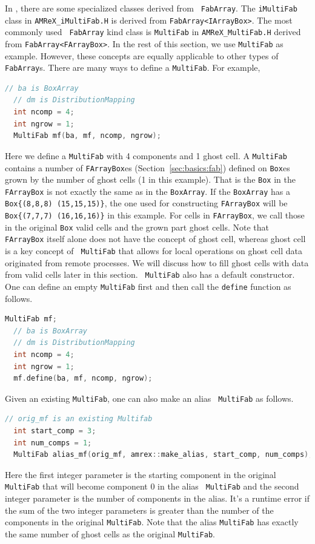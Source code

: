 {{In \amrex, there are some specialized classes derived from {\tt
  FabArray}.  The {\tt iMultiFab} class in {\tt AMReX\_iMultiFab.H} is
derived from {\tt FabArray<IArrayBox>}.  The most commonly used {\tt
  FabArray} kind class is {\tt MultiFab} in {\tt AMReX\_MultiFab.H}
derived from {\tt FabArray<FArrayBox>}.  In the rest of this section,
we use {\tt MultiFab} as example.  However, these concepts are equally
applicable to other types of {\tt FabArray}s.  There are many ways to
define a {\tt MultiFab}.  For example,
\begin{lstlisting}[language=cpp]
  // ba is BoxArray
  // dm is DistributionMapping
  int ncomp = 4;
  int ngrow = 1;
  MultiFab mf(ba, mf, ncomp, ngrow);
\end{lstlisting}
Here we define a {\tt MultiFab} with 4 components and 1 ghost cell.  A
{\tt MultiFab} contains a number of {\tt FArrayBox}es
(Section~\ref{sec:basics:fab}) defined on {\tt Box}es grown by the
number of ghost cells (1 in this example).  That is the {\tt Box} in
the {\tt FArrayBox} is not exactly the same as in the {\tt BoxArray}.
If the {\tt BoxArray} has a {\tt Box\{(8,8,8) (15,15,15)\}}, the one
used for constructing {\tt FArrayBox} will be {\tt Box\{(7,7,7)
  (16,16,16)\}} in this example.  For cells in {\tt FArrayBox}, we
call those in the original {\tt Box} valid cells and the grown part
ghost cells.  Note that {\tt FArrayBox} itself alone does not have the
concept of ghost cell, whereas ghost cell is a key concept of {\tt
  MultiFab} that allows for local operations on ghost cell data
originated from remote processes.  We will discuss how to fill ghost
cells with data from valid cells later in this section.  {\tt
  MultiFab} also has a default constructor.  One can define an empty
{\tt MultiFab} first and then call the {\tt define} function as
follows.
\begin{lstlisting}[language=cpp]
  MultiFab mf;
  // ba is BoxArray
  // dm is DistributionMapping
  int ncomp = 4;
  int ngrow = 1;
  mf.define(ba, mf, ncomp, ngrow);
\end{lstlisting}
Given an existing {\tt MultiFab}, one can also make an alias {\tt
  MultiFab} as follows.
\begin{lstlisting}[language=cpp]
  // orig_mf is an existing Multifab
  int start_comp = 3;
  int num_comps = 1;
  MultiFab alias_mf(orig_mf, amrex::make_alias, start_comp, num_comps);
\end{lstlisting}
Here the first integer parameter is the starting component in the
original {\tt MultiFab} that will become component 0 in the alias {\tt
  MultiFab} and the second integer parameter is the number of
components in the alias.  It's a runtime error if the sum of the two
integer parameters is greater than the number of the components in the
original {\tt MultiFab}.  Note that the alias {\tt MultiFab} has
exactly the same number of ghost cells as the original {\tt MultiFab}.

}}
